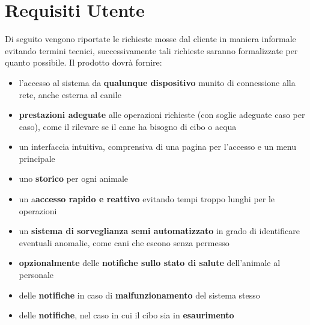 	\section{Requisiti Utente}
	Di seguito vengono riportate le richieste mosse dal cliente in maniera informale evitando termini tecnici, successivamente tali richieste saranno formalizzate per quanto possibile.
	Il prodotto dovrà fornire: 
		\begin{itemize}
            \item l'accesso al sistema da \textbf{qualunque dispositivo} munito di connessione alla rete, anche esterna al canile
            \item\textbf{ prestazioni adeguate} alle operazioni richieste (con soglie adeguate caso per caso), come il rilevare se il cane ha bisogno di cibo o acqua 
            \item un interfaccia intuitiva, comprensiva di una pagina per l'accesso e un menu principale
            \item uno \textbf{storico} per ogni animale
            \item un a\textbf{accesso rapido e reattivo} evitando tempi troppo lunghi per le operazioni
            \item un \textbf{sistema di sorveglianza semi automatizzato }in grado di identificare eventuali anomalie, come cani che escono senza permesso
            \item \textbf{opzionalmente} delle \textbf{notifiche sullo stato di salute} dell'animale al personale
            \item delle \textbf{notifiche} in caso di \textbf{malfunzionamento} del sistema stesso
            \item delle \textbf{notifiche}, nel caso in cui il cibo sia in \textbf{esaurimento} 
        \end{itemize}
